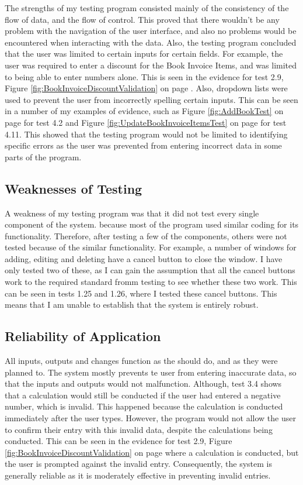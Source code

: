 The strengths of my testing program consisted mainly of the consistency of the flow of data, and the flow of control. This proved that there wouldn't be any problem with the navigation of the user interface, and also no problems would be encountered when interacting with the data. Also, the testing program concluded that the user was limited to certain inputs for certain fields. For example, the user was required to enter a discount for the Book Invoice Items, and was limited to being able to enter numbers alone. This is seen in the evidence for test 2.9, Figure \ref{fig:BookInvoiceDiscountValidation} on page \pageref{fig:BookInvoiceDiscountValidation}. Also, dropdown lists were used to prevent the user from incorrectly spelling certain inputs. This can be seen in a number of my examples of evidence, such as Figure \ref{fig:AddBookTest} on page \pageref{fig:AddBookTest} for test 4.2 and Figure \ref{fig:UpdateBookInvoiceItemsTest} on page \pageref{fig:UpdateBookInvoiceItemsTest} for test 4.11. This showed that the testing program would not be limited to identifying specific errors as the user was prevented from entering incorrect data in some parts of the program.

\subsection{Weaknesses of Testing}

A weakness of my testing program was that it did not test every single component of the system. because most of the program used similar coding for its functionality. Therefore, after testing a few of the components, others were not tested because of the similar functionality. For example, a number of windows for adding, editing and deleting have a cancel button to close the window. I have only tested two of these, as I can gain the assumption that all the cancel buttons work to the required standard fromm testing to see whether these two work. This can be seen in tests 1.25 and 1.26, where I tested these cancel buttons. This means that I am unable to establish that the system is entirely robust.

\subsection{Reliability of Application}

All inputs, outputs and changes function as the should do, and as they were planned to. The system mostly prevents te user from entering inaccurate data, so that the inputs and outputs would not malfunction. Although, test 3.4 shows that a calculation would still be conducted if the user had entered a negative number, which is invalid. This happened because the calculation is conducted immediately after the user types. However, the program would not allow the user to confirm their entry with this invalid data, despite the calculations being conducted. This can be seen in the evidence for test 2.9, Figure \ref{fig:BookInvoiceDiscountValidation} on page \pageref{fig:BookInvoiceDiscountValidation} where a calculation is conducted, but the user is prompted against the invalid entry. Consequently, the system is generally reliable as it is moderately effective in preventing invalid entries.

